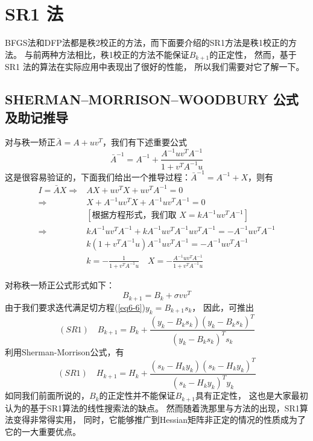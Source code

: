 \documentclass{article}
\begin{document}
\section{SR1 法}
BFGS法和DFP法都是秩2校正的方法，而下面要介绍的SR1方法是秩1校正的方法。
与前两种方法相比，秩1校正的方法不能保证$B_{k+1}$的正定性，
然而，基于SR1 法的算法在实际应用中表现出了很好的性能，
所以我们需要对它了解一下。

\subsection*{SHERMAN–MORRISON–WOODBURY 公式及助记推导}
对与秩一矫正$\bar{A} = A + uv^T$，我们有下述重要公式
\[
  \bar{A}^{-1} = A^{-1} + \frac{A^{-1}uv^TA^{-1}}{1+v^TA^{-1}u}
\]
这是很容易验证的，下面我们给出一个推导过程：$\bar{A}^{-1} = A^{-1}+X$，则有
\[\begin{split}
  I = \bar{A}X \Rightarrow & AX + uv^TX + uv^TA^{-1} = 0\\
  \Rightarrow & X + A^{-1}uv^T X + A^{-1}uv^TA^{-1} = 0\\
  & [\text{根据方程形式，我们取 } X = kA^{-1}uv^TA^{-1}]  \\
  \Rightarrow & kA^{-1}uv^TA^{-1} + k A^{-1}uv^T A^{-1}uv^TA^{-1} = -A^{-1}uv^TA^{-1}\\
  &k(1+v^T A^{-1}u)A^{-1}uv^TA^{-1} = -A^{-1}uv^TA^{-1}\\
  & k = -\frac1{1+v^T A^{-1}u} \quad
  X = -\frac{A^{-1}uv^TA^{-1}}{1+v^T A^{-1}u}
\end{split}\]

对称秩一矫正公式形式如下：
\[
  B_{k+1} = B_k + \sigma vv^T
\]
由于我们要求迭代满足切方程(\ref{eq6-6})$y_k = B_{k+1}s_k$，
因此，可推出
\begin{equation}
    \label{eq6-24}
    (SR1)\quad
    B_{k+1} = B_k + \frac{(y_k - B_ks_k)(y_k - B_ks_k)^T}{(y_k - B_ks_k)^Ts_k}
\end{equation}
利用Sherman-Morrison公式，有
\begin{equation}
  \label{eq6-25}
  (SR1)\quad
  H_{k+1} = H_k + \frac{(s_k-H_ky_k)(s_k-H_ky_k)^T}{(s_k-H_ky_k)^Ty_k}
\end{equation}
如同我们前面所说的，$B_k$的正定性并不能保证$B_{k+1}$具有正定性，
这也是大家最初认为的基于SR1算法的线性搜索法的缺点。
然而随着洗那里与方法的出现，SR1算法变得非常得实用，
同时，它能够推广到Hessian矩阵非正定的情况的性质成为了它的一大重要优点。
\end{document}
